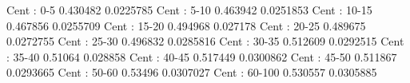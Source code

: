 Cent : 0-5
0.430482 0.0225785
Cent : 5-10
0.463942 0.0251853
Cent : 10-15
0.467856 0.0255709
Cent : 15-20
0.494968 0.027178
Cent : 20-25
0.489675 0.0272755
Cent : 25-30
0.496832 0.0285816
Cent : 30-35
0.512609 0.0292515
Cent : 35-40
0.51064 0.028858
Cent : 40-45
0.517449 0.0300862
Cent : 45-50
0.511867 0.0293665
Cent : 50-60
0.53496 0.0307027
Cent : 60-100
0.530557 0.0305885
